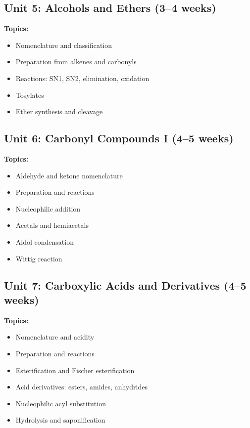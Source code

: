 \documentclass[12pt,oneside]{book}
\begin{document}
\subsection{Unit 5: Alcohols and Ethers (3--4 weeks)}

\textbf{Topics:}
\begin{itemize}
    \item Nomenclature and classification
    \item Preparation from alkenes and carbonyls
    \item Reactions: SN1, SN2, elimination, oxidation
    \item Tosylates
    \item Ether synthesis and cleavage
\end{itemize}

\subsection{Unit 6: Carbonyl Compounds I (4--5 weeks)}

\textbf{Topics:}
\begin{itemize}
    \item Aldehyde and ketone nomenclature
    \item Preparation and reactions
    \item Nucleophilic addition
    \item Acetals and hemiacetals
    \item Aldol condensation
    \item Wittig reaction
\end{itemize}

\subsection{Unit 7: Carboxylic Acids and Derivatives (4--5 weeks)}

\textbf{Topics:}
\begin{itemize}
    \item Nomenclature and acidity
    \item Preparation and reactions
    \item Esterification and Fischer esterification
    \item Acid derivatives: esters, amides, anhydrides
    \item Nucleophilic acyl substitution
    \item Hydrolysis and saponification
\end{itemize}
\end{document}
